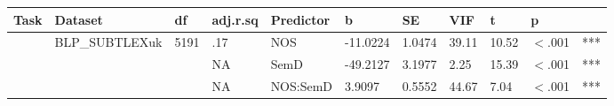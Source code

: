 \begin{table}[ht]
\centering
\begingroup\normalsize
\begin{tabular}{lllllllllll}
  \hline
Task & Dataset & df & adj.r.sq & Predictor & b & SE & VIF & t & p &  \\ 
  \hline
 & BLP\_SUBTLEXuk & 5191 & .17 & NOS & -11.0224 & 1.0474 & 39.11 & 10.52 & $<$.001 & *** \\ 
   &  &  & NA & SemD & -49.2127 & 3.1977 & 2.25 & 15.39 & $<$.001 & *** \\ 
   &  &  & NA & NOS:SemD & 3.9097 & 0.5552 & 44.67 & 7.04 & $<$.001 & *** \\ 
   \hline
\end{tabular}
\endgroup
\end{table}
